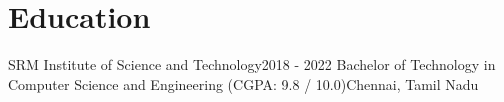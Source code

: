 \section{Education}
    \resumeSubHeadingListStart

    \resumeSubheading
    {SRM Institute of Science and Technology}{2018 - 2022}
    {Bachelor of Technology in Computer Science and Engineering (CGPA: 9.8 / 10.0)}{Chennai, Tamil Nadu}

    \resumeSubHeadingListEnd